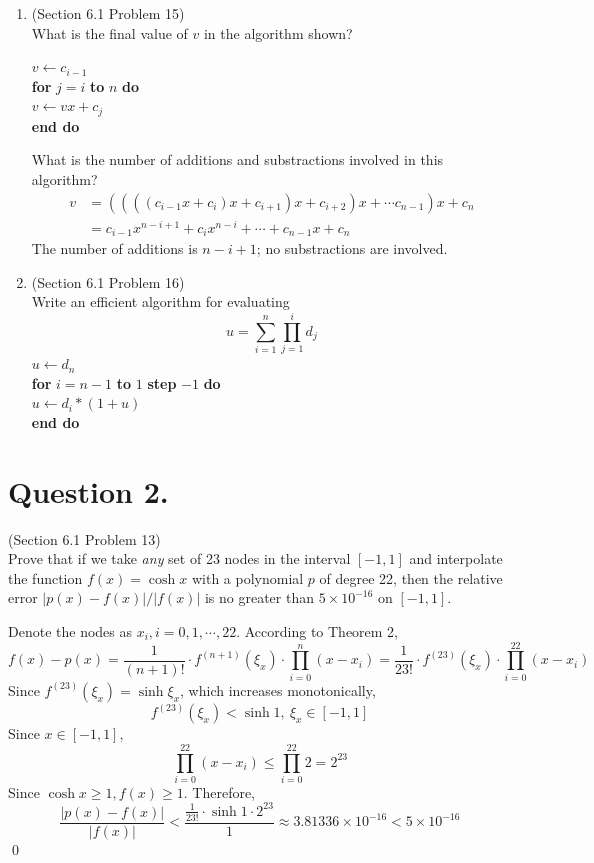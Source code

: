 \documentclass[10pt]{report}
\newcommand{\abs}[1] {\left| #1 \right|}
\begin{document}
\begin{enumerate}
	\item 
	(Section 6.1 Problem 15)\\
	What is the final value of $v$ in the algorithm shown?
	
	$v \leftarrow c_{i-1}$\\
	\textbf{for} $j = i$ \textbf{to} $n$ \textbf{do}\\
	\hspace*{4ex} $v \leftarrow vx + c_j$\\
	\textbf{end do}
	
	What is the number of additions and substractions involved in this algorithm?
	\begin{align*}
		v &= ((((c_{i-1}x + c_i)x + c_{i+1})x + c_{i+2})x + \cdots c_{n-1})x + c_n\\
			&= c_{i-1}x^{n-i+1} + c_ix^{n-i} + \cdots + c_{n-1}x + c_n
	\end{align*}
	The number of additions is $n-i+1$; no substractions are involved.
	
	\item 
	(Section 6.1 Problem 16)\\
	Write an efficient algorithm for evaluating
	\[
	u = \sum_{i=1}^{n} \prod_{j=1}^{i} d_j
	\]
	$u \leftarrow d_{n}$\\
	\textbf{for} $i = n-1$ \textbf{to} $1$ \textbf{step} $-1$ \textbf{do}\\
	\hspace*{4ex} $u \leftarrow d_i*(1+u)$\\
	\textbf{end do}
\end{enumerate}

\section*{Question 2.}
(Section 6.1 Problem 13)\\
Prove that if we take \textit{any} set of 23 nodes in the interval $[-1, 1]$ and interpolate the function $f(x) = \cosh{x}$ with a polynomial $p$ of degree 22, then the relative error $\abs{p(x)-f(x)}/\abs{f(x)}$ is no greater than $5 \times 10^{-16}$ on $[-1, 1]$.

Denote the nodes as $x_i, i=0,1,\cdots,22$. According to Theorem 2,
\[
f(x) - p(x) = \frac{1}{(n+1)!} \cdot f^{(n+1)}(\xi_x) \cdot \prod_{i=0}^{n} (x-x_i)
	= \frac{1}{23!} \cdot f^{(23)}(\xi_x) \cdot \prod_{i=0}^{22} (x-x_i)
\]
Since $f^{(23)}(\xi_x) = \sinh{\xi_x}$, which increases monotonically,
\[
f^{(23)}(\xi_x) < \sinh{1},\ \xi_x\in [-1, 1]
\]
Since $x\in [-1, 1]$,
\[
\prod_{i=0}^{22} (x-x_i) \le \prod_{i=0}^{22} 2 = 2^{23}
\]
Since $\cosh{x} \ge 1, f(x)\ge 1$. Therefore,
\[
\frac{\abs{p(x)-f(x)}}{\abs{f(x)}} < \frac{\frac{1}{23!} \cdot \sinh{1} \cdot 2^{23}}{1}
	\approx 3.81336\times 10^{-16}
	< 5 \times 10^{-16}
\]
\qed
\end{document}

